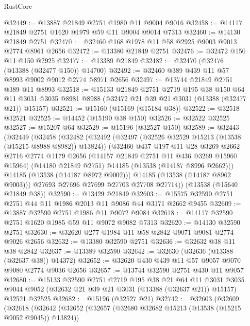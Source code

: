 \begin{lexlean}{RustCore}
\begin{coremodule}
@32449 := @13887 @21849 @2751 @1980 @11 @9004 @9016
@32458 := @14117 @21849 @2751 @1620 @1979 @59 @11 @9004 @9014 @7313
@32460 := @14130 @21849 @2751
@32470 := @32460 @168 @1978 @11 @58 @2925 @9003 @9013 @2774 @8961 @2656
@32472 := @13380 @21849 @2751
@32476 := @32472 @150 @11 @150 @2925
@32477 := @13389 @21849
@32482 := @32470 (@32476 (@13388 (@32477 @150)) @14700)
@32492 := @32460 @389 @439 @11 @57 @8993 @9002 @9012 @2774 @8971 @2656
@32497 := @13744 @21849 @2751 @389 @11 @8993
@32518 := @15133
    @21849
    @2751
    @2719
    @195
    @38
    @150
    @64
    @11
    @3031
    @3035
    @8981
    @8988
    (@32472 @21 @39 @21 @3031 (@13388 (@32477 @21)) @15157)
@32521 := @15160 (@15169 (@15184 @38))
@32522 := @32518 @32521
@32525 := @14452 (@15190 @38 @150)
@32526 := @32522 @32525
@32527 := @15207 @64
@32529 := @15196 (@32527 @150)
@32589 := @32443
    (@32449
      (@32458
        (@32482
          (@32492
            (@32497 (@32526 @32529 @15213 (@13538 (@15215 @8988 @8982)) @13824))
            (@32460
              @437
              @197
              @11
              @28
              @3269
              @2662
              @2716
              @2774
              @1179
              @2656
              (@14157 @21849 @2751 @11 @436 @3269 @15960 @15964)
              (@14180 @21849 @2751)
              @14185
              (@13538 (@14187 @8996 @2662)))
            @14185
            (@13538 (@14187 @8972 @9002)))
          @14185
          (@13538 (@14187 @8962 @9003)))
        @27693
        @27696
        @27699
        @27703
        @27708
        @27714))
    (@13538 (@15640 @21849 @38))
@32590 := @13429 @21849
@32603 := @15575 @32590 @2751 @2751 @44 @11 @1986 @2013 @11 @9086 @44 @3171 @2662 @9455
@32609 := @13887 @32590 @2751 @1986 @11 @9072 @9084
@32618 := @14117 @32590 @2751 @1620 @1985 @59 @11 @9072 @9082 @7313
@32620 := @14130 @32590 @2751
@32630 := @32620 @277 @1984 @11 @58 @2842 @9071 @9081 @2774 @9026 @2656
@32632 := @13380 @32590 @2751
@32636 := @32632 @38 @11 @38 @2842
@32637 := @13389 @32590
@32642 := @32630 (@32636 (@13388 (@32637 @38)) @14372)
@32652 := @32620 @430 @439 @11 @57 @9057 @9070 @9080 @2774 @9036 @2656
@32657 := @13744 @32590 @2751 @430 @11 @9057
@32680 := @15133
    @32590
    @2751
    @2719
    @195
    @38
    @21
    @64
    @11
    @3031
    @3035
    @9044
    @9052
    (@32632 @21 @39 @21 @3031 (@13388 (@32637 @21)) @15157)
    @32521
    @32525
@32682 := @15196 (@32527 @21)
@32742 := @32603
    (@32609
      (@32618
        (@32642
          (@32652
            (@32657 (@32680 @32682 @15213 (@13538 (@15215 @9052 @9045)) @13824))

\end{coremodule}
\end{lexlean}
